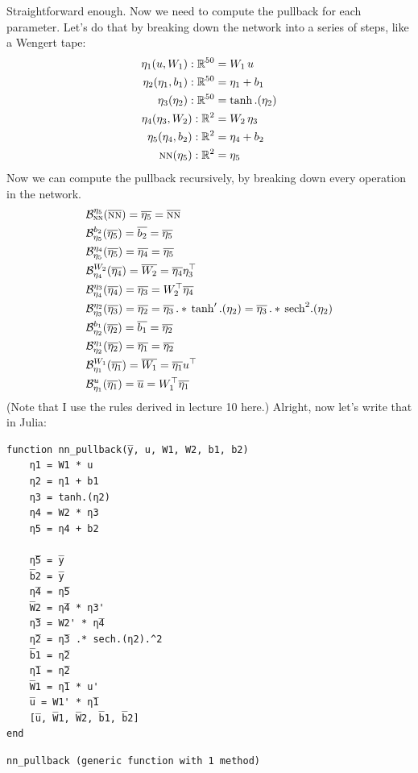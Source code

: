 \documentclass[11pt]{article}
\newcommand{\R}[0]{\mathbb{R}}
\newcommand{\B}[0]{\mathcal{B}}
\newcommand*\lgrad[1]{\overline{#1}}
\newcommand{\NN}[0]{\textsc{nn}}
\newcommand{\transpose}[1]{#1 ^\top}
\begin{document}
Straightforward enough.
Now we need to compute the pullback for each parameter. Let's do that by breaking down the network into a series of steps,
like a Wengert tape:
\begin{align*}
\eta_1(u, W_1) : \R^{50} &= W_1 \, u \\
\eta_2(\eta_1, b_1) : \R^{50} &= \eta_1 + b_1 \\
\eta_3(\eta_2) : \R^{50} &= \tanh.(\eta_2) \\
\eta_4(\eta_3, W_2) : \R^2 &= W_2 \, \eta_3 \\
\eta_5(\eta_4, b_2) : \R^2 &= \eta_4 + b_2 \\
\NN(\eta_5) : \R^2 &= \eta_5
\end{align*}
Now we can compute the pullback recursively, by breaking down every operation in the network.
\begin{align*}
&\B^{\eta_5}_{\NN}(\lgrad{\NN}) = \lgrad{\eta_5} = \lgrad{\NN} \\
&\B^{b_2}_{\eta_5}(\lgrad{\eta_5}) = \lgrad{b_2} =  \lgrad{\eta_5} \\
&\B^{\eta_4}_{\eta_5}(\lgrad{\eta_5}) = \lgrad{\eta_4} =  \lgrad{\eta_5} \\
&\B^{W_2}_{\eta_4}(\lgrad{\eta_4}) = \lgrad{W_2} =  \lgrad{\eta_4} \transpose{\eta_3} \\
&\B^{\eta_3}_{\eta_4}(\lgrad{\eta_4}) = \lgrad{\eta_3} = \transpose{W_2} \lgrad{\eta_4} \\
&\B^{\eta_2}_{\eta_3}(\lgrad{\eta_3}) = \lgrad{\eta_2} = \lgrad{\eta_3} \, .* \, \tanh'.(\eta_2) = \lgrad{\eta_3} \, .* \, \mathrm{sech}^2.(\eta_2)\\
&\B^{b_1}_{\eta_2}(\lgrad{\eta_2}) = \lgrad{b_1} = \lgrad{\eta_2}\\
&\B^{\eta_1}_{\eta_2}(\lgrad{\eta_2}) = \lgrad{\eta_1} = \lgrad{\eta_2}\\
&\B^{W_1}_{\eta_1}(\lgrad{\eta_1}) = \lgrad{W_1} = \lgrad{\eta_1} \transpose{u}\\
&\B^{u}_{\eta_1}(\lgrad{\eta_1}) = \lgrad{u} = \transpose{W_1} \lgrad{\eta_1}
\end{align*}
(Note that I use the rules derived in lecture 10 here.)
Alright, now let's write that in Julia:
\begin{verbatim}
function nn_pullback(y̅, u, W1, W2, b1, b2)
    η1 = W1 * u
    η2 = η1 + b1
    η3 = tanh.(η2)
    η4 = W2 * η3
    η5 = η4 + b2

    η̅5 = y̅
    b̅2 = y̅
    η̅4 = η̅5
    W̅2 = η̅4 * η3'
    η̅3 = W2' * η̅4
    η̅2 = η̅3 .* sech.(η2).^2
    b̅1 = η̅2
    η̅1 = η̅2
    W̅1 = η̅1 * u'
    u̅ = W1' * η̅1
    [u̅, W̅1, W̅2, b̅1, b̅2]
end
\end{verbatim}
\begin{verbatim}
nn_pullback (generic function with 1 method)
\end{verbatim}
\end{document}
